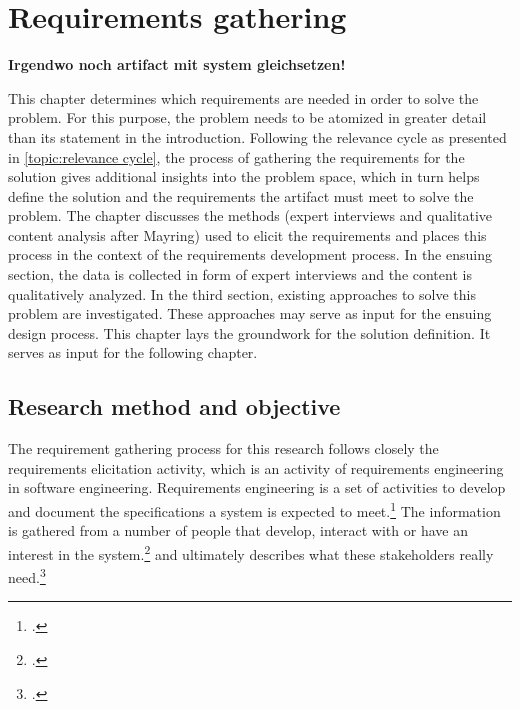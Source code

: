 \chapter{Requirements gathering} \label{chap:ReqEng}
\textbf{Irgendwo noch artifact mit system gleichsetzen!}

This chapter determines which requirements are needed in order to solve the problem. For this purpose, the problem needs to be atomized in greater detail than its statement in the introduction. Following the relevance cycle as presented in \ref{topic:relevance cycle}, the process of gathering the requirements for the solution gives additional insights into the problem space, which in turn helps define the solution and the requirements the artifact must meet to solve the problem. The chapter discusses the methods (expert interviews and qualitative content analysis after Mayring) used to elicit the requirements and places this process in the context of the requirements development process. In the ensuing section, the data is collected in form of expert interviews and the content is qualitatively analyzed. In the third section, existing approaches to solve this problem are investigated. These approaches may serve as input for the ensuing design process. This chapter lays the groundwork for the solution definition. It serves as input for the following chapter. 

\section{Research method and objective}
The requirement gathering process for this research follows closely the requirements elicitation activity, which is an activity of requirements engineering in software engineering. Requirements engineering is a set of activities to develop and document the specifications a system is expected to meet.\footcite[Cf.][p.16]{SommervilleIntegratedrequirementsengineering2005} The information is gathered from a number of people that develop, interact with or have an interest in the system.\footcite[Cf.][p.38]{PatakiSystemRequirementsAnalysis2003} and ultimately describes what these stakeholders really need.\footcite[Cf.][p.1]{GoguenTechniquesrequirementelicitation1993}

